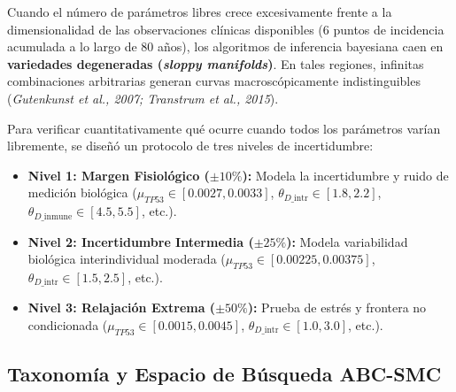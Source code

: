 \documentclass[10pt,a4paper]{article}
\begin{document}
Cuando el número de parámetros libres crece excesivamente frente a la dimensionalidad de las observaciones clínicas disponibles (6 puntos de incidencia acumulada a lo largo de 80 años), los algoritmos de inferencia bayesiana caen en \textbf{variedades degeneradas (\textit{sloppy manifolds})}. En tales regiones, infinitas combinaciones arbitrarias generan curvas macroscópicamente indistinguibles (\textit{Gutenkunst et al., 2007; Transtrum et al., 2015}).

Para verificar cuantitativamente qué ocurre cuando todos los parámetros varían libremente, se diseñó un protocolo de tres niveles de incertidumbre:
\begin{itemize}
    \item \textbf{Nivel 1: Margen Fisiológico ($\pm10\%$):} Modela la incertidumbre y ruido de medición biológica ($\mu_{TP53} \in [0.0027, 0.0033]$, $\theta_{D\text{\_intr}} \in [1.8, 2.2]$, $\theta_{D\text{\_inmune}} \in [4.5, 5.5]$, etc.).
    \item \textbf{Nivel 2: Incertidumbre Intermedia ($\pm25\%$):} Modela variabilidad biológica interindividual moderada ($\mu_{TP53} \in [0.00225, 0.00375]$, $\theta_{D\text{\_intr}} \in [1.5, 2.5]$, etc.).
    \item \textbf{Nivel 3: Relajación Extrema ($\pm50\%$):} Prueba de estrés y frontera no condicionada ($\mu_{TP53} \in [0.0015, 0.0045]$, $\theta_{D\text{\_intr}} \in [1.0, 3.0]$, etc.).
\end{itemize}

\subsection{Taxonomía y Espacio de Búsqueda ABC-SMC}
\end{document}
